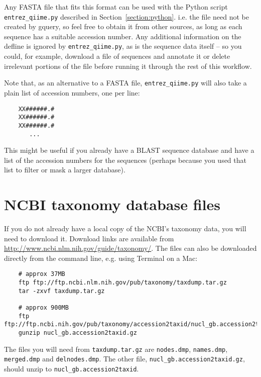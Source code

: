 \documentclass[11pt]{amsart}
\begin{document}
Any FASTA file that fits this format can be used with the Python script \verb|entrez_qiime.py| described in Section~\ref{section:python}. i.e. the file need not be created by gquery, so feel free to obtain it from other sources, as long as each sequence has a suitable accession number. Any additional information on the defline is ignored by \verb|entrez_qiime.py|, as is the sequence data itself -- so you could, for example, download a file of sequences and annotate it or delete irrelevant portions of the file before running it through the rest of this workflow.

Note that, as an alternative to a FASTA file, \verb|entrez_qiime.py| will also take a plain list of accession numbers, one per line:

\begin{verbatim}
    XX######.#
    XX######.#
    XX######.#
       ...
\end{verbatim}

This might be useful if you already have a BLAST sequence database and have a list of the accession numbers for the sequences (perhaps because you used that list to filter or mask a larger database).

\section{NCBI taxonomy database files}
\label{section:taxonomy}

If you do not already have a local copy of the NCBI's taxonomy data, you will need to download it. Download links are available from \url{http://www.ncbi.nlm.nih.gov/guide/taxonomy/}. The files can also be downloaded directly from the command line, e.g. using Terminal on a Mac:

\begin{verbatim}
    # approx 37MB
    ftp ftp://ftp.ncbi.nlm.nih.gov/pub/taxonomy/taxdump.tar.gz
    tar -zxvf taxdump.tar.gz
    
    # approx 900MB
    ftp ftp://ftp.ncbi.nih.gov/pub/taxonomy/accession2taxid/nucl_gb.accession2taxid.gz
    gunzip nucl_gb.accession2taxid.gz
\end{verbatim}

The files you will need from \verb|taxdump.tar.gz| are \verb|nodes.dmp|, \verb|names.dmp|, \verb|merged.dmp| and \verb|delnodes.dmp|. The other file, \verb|nucl_gb.accession2taxid.gz|, should unzip to \verb|nucl_gb.accession2taxid|.
\end{document}
